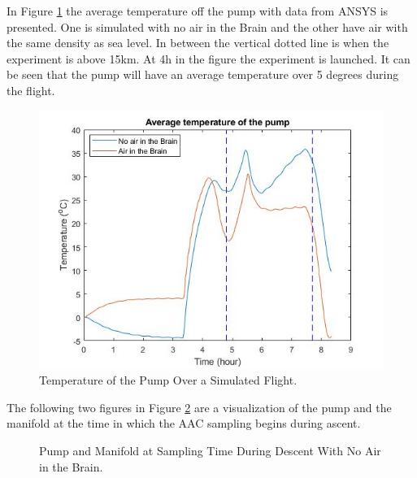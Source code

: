 In Figure \ref{fig:test-flight-AAC-4-6} the average temperature off the pump with data from ANSYS is presented. One is simulated with no air in the Brain and the other have air with the same density as sea level. In between the vertical dotted line is when the experiment is above 15km. At 4h in the figure the experiment is launched. It can be seen that the pump will have an average temperature over 5 degrees during the flight.
\begin{figure}[H]
    \centering
    \includegraphics[width=\textwidth]{4-experiment-design/img/Thermal/pump-temperature-air-no-air.jpg}
    \caption{Temperature of the Pump Over a Simulated Flight.}
    \label{fig:test-flight-AAC-4-6}
\end{figure}

The following two figures in Figure \ref{fig:Pump-Valve-ascent-sample-4-6} are a visualization of the pump and the manifold at the time in which the AAC sampling begins during ascent. 
\begin{figure}[H]
    \centering
    \hifll
    \caption{Pump and Manifold at Sampling Time During Descent With No Air in the Brain.}
    \label{fig:Pump-Valve-ascent-sample-4-6}
\end{figure}

